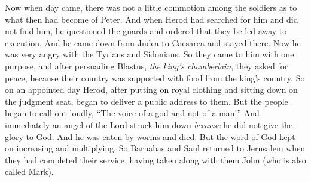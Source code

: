 \begin{biblechapter}
\verse Now when day came, there was not a little commotion among the soldiers as to what then had become of Peter.
\verse And when Herod had searched for him and did not find him, he questioned the guards and ordered that they be led away to execution. And he came down from Judea to Caesarea and stayed there.
 Now he was very angry with the Tyrians and Sidonians. So they came to him with one purpose, and after persuading Blastus, \textit{the king’s chamberlain}, they asked for peace, because their country was supported with food from the king’s country.
\verse So on an appointed day Herod, after putting on royal clothing and sitting down on the judgment seat, began to deliver a public address to them.
\verse But the people began to call out loudly, “The voice of a god and not of a man!”
\verse And immediately an angel of the Lord struck him down \textit{because} he did not give the glory to God. And he was eaten by worms and died.
\verse But the word of God kept on increasing and multiplying.
\verse So Barnabas and Saul returned to Jerusalem when they had completed their service, having taken along with them John (who is also called Mark).
\end{biblechapter}


